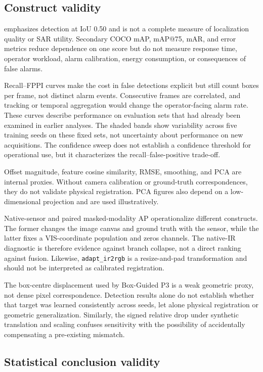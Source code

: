 \subsection{Construct validity}

\mapfifty{} emphasizes detection at IoU 0.50 and is not a complete measure of
localization quality or SAR utility. Secondary COCO mAP, mAP@75, mAR, and error
metrics reduce dependence on one score but do not measure response time,
operator workload, alarm calibration, energy consumption, or consequences of
false alarms.

Recall--FPPI curves make the cost in false detections explicit but still count
boxes per frame, not distinct alarm events. Consecutive frames are correlated,
and tracking or temporal aggregation would change the operator-facing alarm
rate. These curves describe performance on evaluation sets that had already
been examined in earlier analyses. The shaded bands show variability
across five training seeds on these fixed sets, not uncertainty about
performance on new acquisitions. The confidence sweep does not establish
a confidence threshold for operational use, but it characterizes
the recall--false-positive trade-off.

Offset magnitude, feature cosine similarity, RMSE, smoothing, and PCA are
internal proxies. Without camera calibration or ground-truth correspondences,
they do not validate physical registration. PCA figures also depend on a
low-dimensional projection and are used illustratively.

Native-sensor and paired masked-modality AP operationalize different
constructs. The former changes the image canvas and ground truth with the
sensor, while the latter fixes a VIS-coordinate population and zeros channels.
The native-IR diagnostic is therefore evidence against branch collapse, not a
direct ranking against fusion. Likewise, \texttt{adapt\_ir2rgb} is a
resize-and-pad transformation and should not be interpreted as calibrated
registration.

The box-centre displacement used by Box-Guided P3 is a weak geometric proxy,
not dense pixel correspondence. Detection results alone do not establish
whether that target was learned consistently across seeds, let alone physical
registration or geometric generalization. Similarly, the signed relative drop
under synthetic translation and scaling confuses sensitivity with the
possibility of accidentally compensating a pre-existing mismatch.

\subsection{Statistical conclusion validity}

